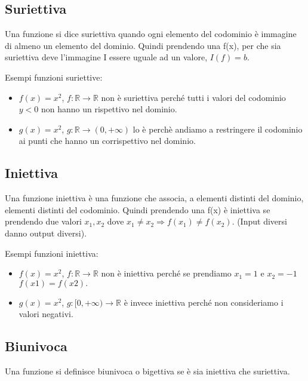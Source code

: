 \subsection{Suriettiva}
\begin{definition}[Suriettiva]
Una funzione si dice suriettiva quando ogni elemento del codominio è immagine di almeno un elemento del dominio. Quindi prendendo una f(x), per che sia suriettiva deve l'immagine I essere uguale ad un valore, $I(f) = b$.
\end{definition}
\begin{example}
    Esempi funzioni suriettive:
    \begin{itemize}
        \item $f(x) = x^2$, $f: \mathbb{R} \longrightarrow \mathbb{R}$ non è suriettiva perché tutti i valori del codominio $y < 0$ non hanno un rispettivo nel dominio.
        \item $g(x) = x^2$, $g: \mathbb{R} \longrightarrow (0, +\infty)$ lo è perchè andiamo a restringere il codominio ai punti che hanno un corrispettivo nel dominio.
    \end{itemize}
\end{example}

\subsection{Iniettiva}
\begin{definition}[Iniettiva]
Una funzione iniettiva è una funzione che associa, a elementi distinti del dominio, elementi distinti del codominio. Quindi prendendo una f(x) è iniettiva se prendendo due valori $x_1, x_2$ dove $x_1 \neq x_2 \Longrightarrow f(x_1) \neq f(x_2)$. (Input diversi danno output diversi).
\end{definition}
\begin{example}
    Esempi funzioni iniettiva:
    \begin{itemize}
        \item $f(x) = x^2$, $f: \mathbb{R} \longrightarrow \mathbb{R}$ non è iniettiva perché se prendiamo $x_1 = 1$ e $x_2 = -1$ $f(x1) = f(x2).$
        \item $g(x) = x^2$, $g: [0, +\infty) \longrightarrow \mathbb{R}$ è invece iniettiva perché non consideriamo i valori negativi.
    \end{itemize}
\end{example}

\subsection{Biunivoca}
\begin{definition}[Biunivoca]
Una funzione si definisce biunivoca o bigettiva se è sia iniettiva che suriettiva.
\end{definition}

